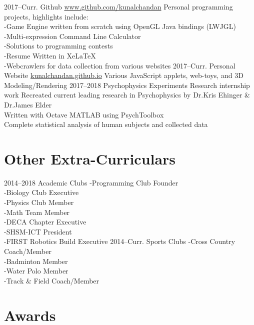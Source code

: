 \documentclass[]{chandan-cv}
\begin{document}
\begin{entrylist}
  \entry
    {2017–Curr.}
    {Github}
    {\href{https://github.com/kunalchandan}{www.github.com/kunalchandan}}
    {Personal programming projects, highlights include:
	\\-Game Engine written from scratch using OpenGL Java bindings (LWJGL)	
	\\-Multi-expression Command Line Calculator
	\\-Solutions to programming contests
	\\-Resume Written in XeLaTeX
	\\-Webcrawlers for data collection from various websites}
  \entry
    {2017–Curr.}
    {Personal Website}
    {\href{https://kunalchandan.github.io}{kunalchandan.github.io}}
    {Various JavaScript applets, web-toys, and 3D Modeling/Rendering}
  \entry
    {2017–2018}
    {Psychophysics Experiments}
    {Research internship work}
    {Recreated current leading research in Psychophysics by Dr.Kris Ehinger \& Dr.James Elder
    \\Written with Octave MATLAB using PsychToolbox
    \\Complete statistical analysis of human subjects and collected data}
\end{entrylist}

\newpage

\section{Other Extra-Curriculars}

\begin{entrylist}
  \entry
    {2014–2018}
    {Academic Clubs}
    {}
    { -Programming Club Founder
    \\-Biology Club Executive
    \\-Physics Club Member
    \\-Math Team Member
    \\-DECA Chapter Executive
    \\-SHSM-ICT President
    \\-FIRST Robotics Build Executive}
  \entry
    {2014–Curr.}
    {Sports Clubs}
    {}
    { -Cross Country Coach/Member
    \\-Badminton Member
    \\-Water Polo Member
    \\-Track \& Field Coach/Member}
\end{entrylist}

\section{Awards}
\end{document}
